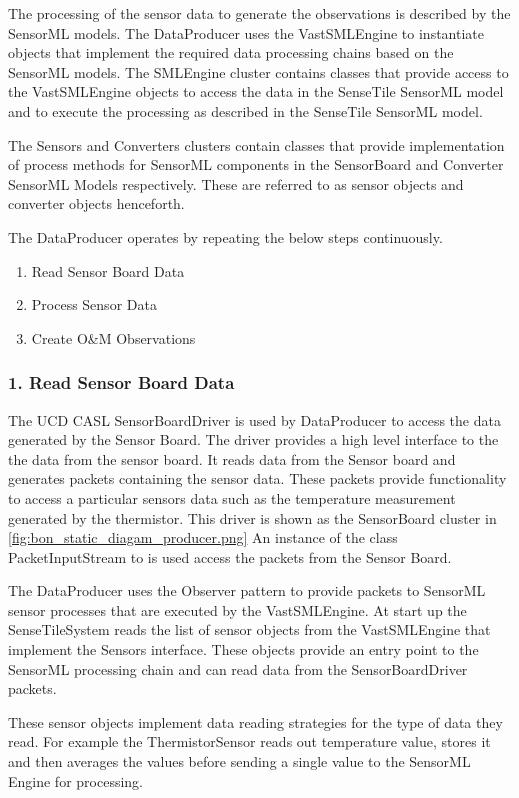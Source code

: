 \documentclass[]{final_report}
\begin{document}
The processing of the sensor data to generate the observations is described by the SensorML models. The DataProducer uses the VastSMLEngine to instantiate objects that implement the required data processing chains based on the SensorML models.  The SMLEngine cluster contains classes that provide access to the VastSMLEngine objects to access the data in the SenseTile SensorML model and to execute the processing as described in the SenseTile SensorML model.

The Sensors and Converters clusters contain classes that provide
implementation of process methods for SensorML components in the SensorBoard and
Converter SensorML Models respectively. These are referred to as sensor objects and
converter objects henceforth.

The DataProducer operates by repeating the below steps continuously.
 \begin{enumerate}
\item Read Sensor Board Data
\item Process Sensor Data
\item Create O\&M Observations
\end{enumerate}

\subsubsection {1. Read Sensor Board Data}

The UCD CASL SensorBoardDriver is used by DataProducer to access
the data generated by the Sensor Board. The driver provides a high level interface to the
the data from the sensor board. It reads data from the Sensor board and generates packets
containing the sensor data. These packets provide functionality
to access a particular sensors data such as the temperature
measurement generated by the thermistor. 
This driver is shown as the SensorBoard cluster in \ref{fig:bon_static_diagam_producer.png}
An instance of the class PacketInputStream to is used access the packets from the Sensor Board.

The DataProducer uses the Observer pattern to provide
packets to SensorML sensor processes that are executed by the VastSMLEngine.
At start up the SenseTileSystem reads the list of sensor objects from the VastSMLEngine that
implement the Sensors interface. These objects provide an entry point
to the SensorML processing chain and can read data from the SensorBoardDriver packets.

These sensor objects implement data reading strategies for the type of data they read. 
For example the ThermistorSensor reads out temperature value, stores it
and then averages the values before sending a single value to the SensorML Engine for processing.
\end{document}
